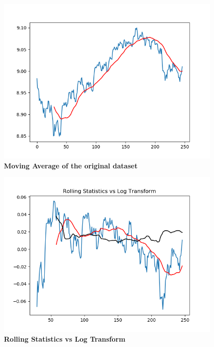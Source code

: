 \documentclass[BTech]{srmuthesis}
\begin{document}
\begin{figure}[H]
	\centering
	\includegraphics[width=\linewidth]{ARIMA_MAOri.png}
	\caption{\bf Moving Average of the original dataset}
	\label{fig:ARIMA_MAFOri}
\end{figure}

\begin{figure}[H]
	\centering
	\includegraphics[width=\linewidth]{ARIMA_RSLog.png}
	\caption{\bf Rolling Statistics vs Log Transform}
	\label{fig:ARIMA_ARIMA_RSLog}
\end{figure}
\end{document}
